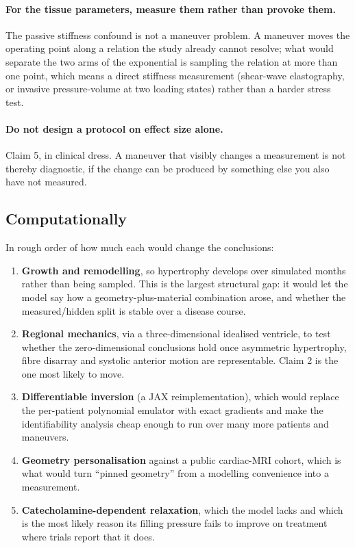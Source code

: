\documentclass[11pt,a4paper]{article}
\begin{document}
\paragraph{For the tissue parameters, measure them rather than provoke them.} The passive
stiffness confound is not a maneuver problem. A maneuver moves the operating point along a
relation the study already cannot resolve; what would separate the two arms of the
exponential is sampling the relation at more than one point, which means a direct stiffness
measurement (shear-wave elastography, or invasive pressure-volume at two loading states)
rather than a harder stress test.

\paragraph{Do not design a protocol on effect size alone.} Claim 5, in clinical dress. A
maneuver that visibly changes a measurement is not thereby diagnostic, if the change can be
produced by something else you also have not measured.

\subsection{Computationally}

In rough order of how much each would change the conclusions:

\begin{enumerate}[nosep,leftmargin=1.4em]
  \item \textbf{Growth and remodelling}, so hypertrophy develops over simulated months
        rather than being sampled. This is the largest structural gap: it would let the model
        say how a geometry-plus-material combination arose, and whether the measured/hidden
        split is stable over a disease course.
  \item \textbf{Regional mechanics}, via a three-dimensional idealised ventricle, to test
        whether the zero-dimensional conclusions hold once asymmetric hypertrophy, fibre
        disarray and systolic anterior motion are representable. Claim 2 is the one most
        likely to move.
  \item \textbf{Differentiable inversion} (a JAX reimplementation), which would replace the
        per-patient polynomial emulator with exact gradients and make the identifiability
        analysis cheap enough to run over many more patients and maneuvers.
  \item \textbf{Geometry personalisation} against a public cardiac-MRI cohort, which is what
        would turn ``pinned geometry'' from a modelling convenience into a measurement.
  \item \textbf{Catecholamine-dependent relaxation}, which the model lacks and which is the
        most likely reason its filling pressure fails to improve on treatment where trials
        report that it does.
\end{enumerate}
\end{document}
